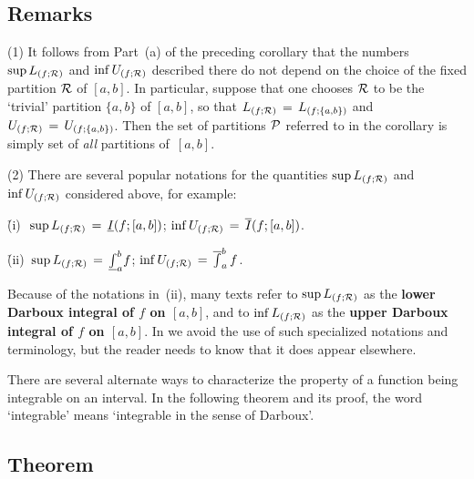 \V

        \subsection{\small{{\bf Remarks}}}
        \label{RemrkH20.35A}

\V

\hspace*{\parindent}(1) It follows from Part~(a) of the preceding corollary that the numbers ${\sup}\,L_{(f;{\cal R})}$
    and ${\inf}\,U_{(f;{\cal R})}$ described there do not depend on the choice of the fixed partition ${\cal R}$ of $[a,b]$.
    In particular, suppose that one chooses ${\cal R}$ to be the `trivial' partition $\{a,b\}$ of $[a,b]$, so that $L_{(f;{\cal R})} \,=\, L_{(f;\{a,b\})}$ and $U_{(f;{\cal R})} \,=\, U_{(f;\{a,b\})}$.
    Then the set of partitions ${\cal P}$ referred to in the corollary is simply set of {\em all} partitions of~$[a,b]$.

\V

     (2) There are several popular notations for the quantities ${\sup}\,L_{(f;{\cal R})}$ and ${\inf}\,U_{(f;{\cal R})}$ considered above, for example:

\VA

        \h (i)\,\, ${\sup}\,L_{(f;{\cal R})} \,=\, \underline{I}(f;[a,b])$; ${\inf}\,U_{(f;{\cal R})} \,=\, \overline{I}(f;[a,b])$.

\VA

        \h (ii)\, ${\sup}\,L_{(f;{\cal R})} \,=\, \underline{\int}_{a}^{b} f$; ${\inf}\,U_{(f;{\cal R})} \,=\, \overline{\int}_{a}^{b}\,f$.

\VA

        Because of the notations in~(ii), many texts refer to ${\sup}\,L_{(f;{\cal R})}$ as the {\bf lower Darboux integral of $f$ on $[a,b]$},
    and to ${\inf}\,L_{(f;{\cal R})}$ as the {\bf upper Darboux integral of $f$ on $[a,b]$}.
    In {\ThisText} we avoid the use of such specialized notations and terminology, but the reader needs to know that it does appear elsewhere.

\VV


        There are several alternate ways to characterize the property of a function being integrable on an interval.
    In the following theorem and its proof, the word `integrable' means `integrable in the sense of Darboux'.

\V

        \subsection{\small{{\bf Theorem}}}
        \label{ThmH20.40}


